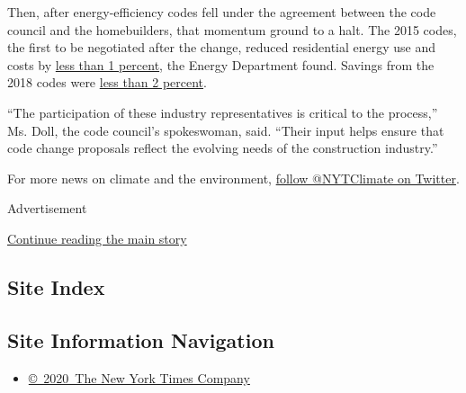 Then, after energy-efficiency codes fell under the agreement between the
code council and the homebuilders, that momentum ground to a halt. The
2015 codes, the first to be negotiated after the change, reduced
residential energy use and costs by
\href{https://www.federalregister.gov/documents/2015/06/11/2015-14297/determination-regarding-energy-efficiency-improvements-in-the-2015-international-energy-conservation}{less
than 1 percent}, the Energy Department found. Savings from the 2018
codes were
\href{https://www.energycodes.gov/regulatory/determinations/residential-determination}{less
than 2 percent}.

``The participation of these industry representatives is critical to the
process,'' Ms. Doll, the code council's spokeswoman, said. ``Their input
helps ensure that code change proposals reflect the evolving needs of
the construction industry.''

For more news on climate and the environment,
\href{https://twitter.com/nytclimate}{follow @NYTClimate on Twitter}.

Advertisement

\protect\hyperlink{after-bottom}{Continue reading the main story}

\hypertarget{site-index}{%
\subsection{Site Index}\label{site-index}}

\hypertarget{site-information-navigation}{%
\subsection{Site Information
Navigation}\label{site-information-navigation}}

\begin{itemize}
\tightlist
\item
  \href{https://help.nytimes3xbfgragh.onion/hc/en-us/articles/115014792127-Copyright-notice}{©~2020~The
  New York Times Company}
\end{itemize}

